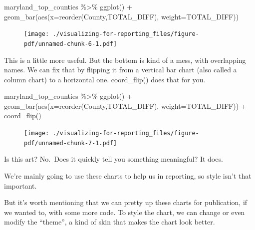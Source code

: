 \documentclass[
  letterpaper,
  DIV=11,
  numbers=noendperiod]{scrreprt}
\newenvironment{Shaded}{\begin{snugshade}}{\end{snugshade}}
\newcommand{\AttributeTok}[1]{\textcolor[rgb]{0.40,0.45,0.13}{#1}}
\newcommand{\FunctionTok}[1]{\textcolor[rgb]{0.28,0.35,0.67}{#1}}
\newcommand{\NormalTok}[1]{\textcolor[rgb]{0.00,0.23,0.31}{#1}}
\newcommand{\SpecialCharTok}[1]{\textcolor[rgb]{0.37,0.37,0.37}{#1}}
\begin{document}
\begin{Shaded}
\begin{Highlighting}[]
\NormalTok{maryland\_top\_counties }\SpecialCharTok{\%\textgreater{}\%}
  \FunctionTok{ggplot}\NormalTok{() }\SpecialCharTok{+}
  \FunctionTok{geom\_bar}\NormalTok{(}\FunctionTok{aes}\NormalTok{(}\AttributeTok{x=}\FunctionTok{reorder}\NormalTok{(County,TOTAL\_DIFF), }\AttributeTok{weight=}\NormalTok{TOTAL\_DIFF))}
\end{Highlighting}
\end{Shaded}

\begin{figure}[H]

{\centering \texttt{[image: ./visualizing-for-reporting\_files/figure-pdf/unnamed-chunk-6-1.pdf]}

}

\end{figure}

This is a little more useful. But the bottom is kind of a mess, with
overlapping names. We can fix that by flipping it from a vertical bar
chart (also called a column chart) to a horizontal one. coord\_flip()
does that for you.

\begin{Shaded}
\begin{Highlighting}[]
\NormalTok{maryland\_top\_counties }\SpecialCharTok{\%\textgreater{}\%}
  \FunctionTok{ggplot}\NormalTok{() }\SpecialCharTok{+}
  \FunctionTok{geom\_bar}\NormalTok{(}\FunctionTok{aes}\NormalTok{(}\AttributeTok{x=}\FunctionTok{reorder}\NormalTok{(County,TOTAL\_DIFF), }\AttributeTok{weight=}\NormalTok{TOTAL\_DIFF)) }\SpecialCharTok{+}
  \FunctionTok{coord\_flip}\NormalTok{()}
\end{Highlighting}
\end{Shaded}

\begin{figure}[H]

{\centering \texttt{[image: ./visualizing-for-reporting\_files/figure-pdf/unnamed-chunk-7-1.pdf]}

}

\end{figure}

Is this art? No.~Does it quickly tell you something meaningful? It does.

We're mainly going to use these charts to help us in reporting, so style
isn't that important.

But it's worth mentioning that we can pretty up these charts for
publication, if we wanted to, with some more code. To style the chart,
we can change or even modify the ``theme'', a kind of skin that makes
the chart look better.
\end{document}
